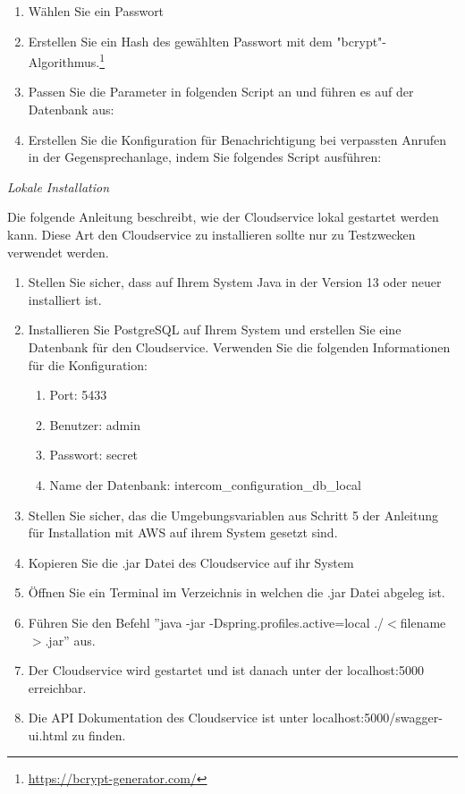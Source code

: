\begin{enumerate}
\begin{enumerate}
        \item Wählen Sie ein Passwort
        \item Erstellen Sie ein Hash des gewählten Passwort mit dem "bcrypt"-Algorithmus.\footnote{\url{https://bcrypt-generator.com/}}
        \item Passen Sie die Parameter in folgenden Script an und führen es auf der Datenbank aus:
        
        \item Erstellen Sie die Konfiguration für Benachrichtigung bei verpassten Anrufen in der Gegensprechanlage, indem Sie folgendes Script ausführen:
        
    \end{enumerate}

\end{enumerate}

\clearpage

\textit{Lokale Installation}

Die folgende Anleitung beschreibt, wie der Cloudservice lokal gestartet werden kann.
Diese Art den Cloudservice zu installieren sollte nur zu Testzwecken verwendet werden.

\begin{enumerate}
    \item Stellen Sie sicher, dass auf Ihrem System Java in der Version 13 oder neuer installiert ist.
    \item Installieren Sie PostgreSQL auf Ihrem System und erstellen Sie eine Datenbank für den Cloudservice.
    Verwenden Sie die folgenden Informationen für die Konfiguration: 
    \begin{enumerate}
        \item Port: 5433
        \item Benutzer: admin
        \item Passwort: secret
        \item Name der Datenbank: intercom\_configuration\_db\_local
    \end{enumerate}
    \item Stellen Sie sicher, das die Umgebungsvariablen aus Schritt 5 der Anleitung für Installation mit AWS auf ihrem System gesetzt sind.
    \item Kopieren Sie die .jar Datei des Cloudservice auf ihr System
    \item Öffnen Sie ein Terminal im Verzeichnis in welchen die .jar Datei abgeleg ist.
    \item Führen Sie den Befehl ''java -jar -Dspring.profiles.active=local ./$<$filename$>$.jar'' aus.
    \item Der Cloudservice wird gestartet und ist danach unter der localhost:5000 erreichbar.
    \item Die API Dokumentation des Cloudservice ist unter localhost:5000/swagger-ui.html zu finden.
\end{enumerate}


